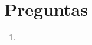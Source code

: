 \documentclass[11pt]{article}
\begin{document}




\section*{Preguntas}

\begin{enumerate}
    \item  
\end{enumerate}
\end{document}
